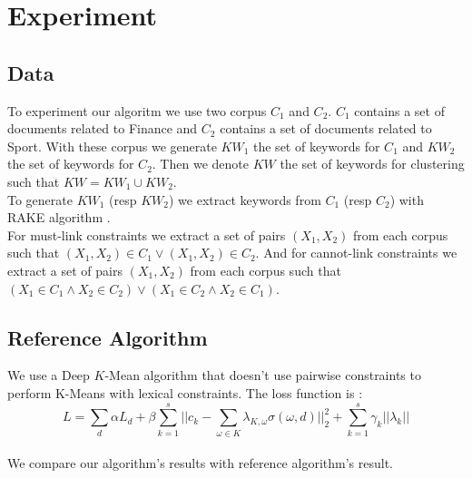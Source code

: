 \section{Experiment}
\subsection{Data}
To experiment our algoritm we use two corpus $C_1$ and $C_2$. $C_1$ contains a
set of documents related to Finance and $C_2$ contains a set of documents
related to Sport. With these corpus we generate $KW_1$ the set of keywords
for $C_1$ and $KW_2$ the set of keywords for $C_2$. Then we denote $KW$
the set of keywords for clustering such that $KW = KW_1 \cup KW_2$.\\
To generate $KW_1$ (resp $KW_2$) we extract keywords from $C_1$ (resp $C_2$)
with RAKE algorithm \cite{rake}.\\
For must-link constraints we extract a set of pairs $(X_1, X_2)$ from each corpus such that
$(X_1, X_2) \in C_1 \vee (X_1, X_2) \in C_2$. And for cannot-link constraints we
extract a set of pairs $(X_1, X_2)$ from  each corpus such that
$(X_1 \in C_1 \wedge  X_2 \in C_2)\vee (X_1 \in C_2 \wedge  X_2 \in C_1)$. 
\subsection{Reference Algorithm}
We use a Deep $K$-Mean algorithm that doesn't use pairwise constraints
to perform K-Means with lexical constraints. The loss function is :
\begin{equation}\label{eq:lies}
  L = \sum_d \alpha L_d + \beta \sum_{k=1}^s || c_k - \sum_{\omega \in K}
  \lambda_{K, \omega} \sigma(\omega, d)||_2^2 + \sum_{k=1}^s \gamma_k
  || \lambda_k||
\end{equation}
\\We compare our algorithm's results with reference algorithm's result.    
